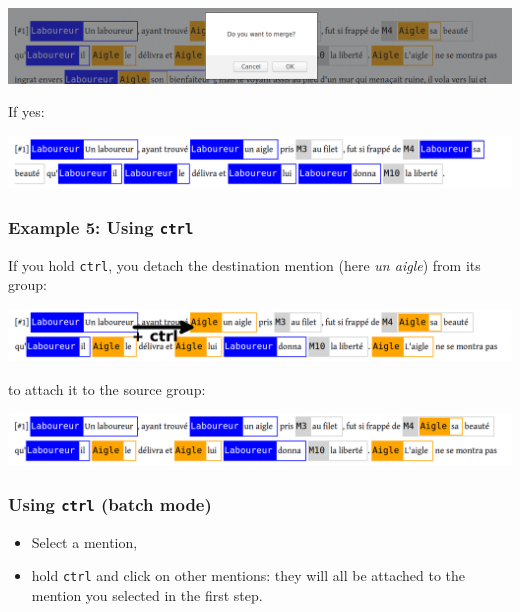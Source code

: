 \documentclass[12pt]{article}
\begin{document}
\includegraphics[width=17cm]{imgs/dd_example_03_dialog.png}

If yes:\nopagebreak

\includegraphics[width=17cm]{imgs/dd_example_03_after.png}

 \subsubsection{Example 5: Using \texttt{ctrl}}

If you hold \verb|ctrl|, you detach the destination mention (here \emph{un
aigle}) from its group:\nopagebreak

\includegraphics[width=17cm]{imgs/dd_example_04_before.png}

to attach it to the source group:\nopagebreak

\includegraphics[width=17cm]{imgs/dd_example_04_after.png}

 \subsubsection{Using \texttt{ctrl} (batch mode)}

\begin{itemize}
   \item Select a mention,
   \item hold \verb|ctrl| and click on other mentions: they will all be
   attached to the mention you selected in the first step.
\end{itemize}
\end{document}
